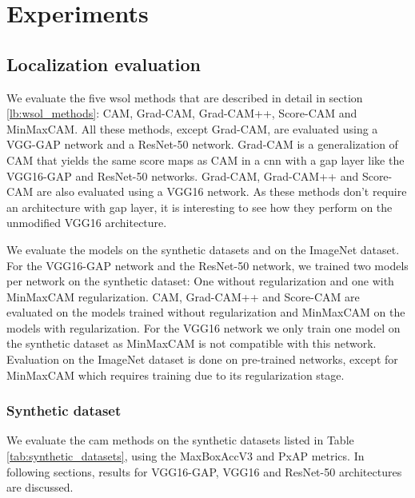 \chapter{Experiments}



\section{Localization evaluation}
We evaluate the five \acrshort{wsol} methods that are described in detail in section \ref{lb:wsol_methods}: CAM, Grad-CAM, Grad-CAM++, Score-CAM and MinMaxCAM. All these methods, except Grad-CAM, are evaluated using a VGG-GAP network and a ResNet-50 network. Grad-CAM is a generalization of CAM that yields the same score maps as CAM in a \acrshort{cnn} with a \acrshort{gap} layer like the VGG16-GAP and ResNet-50 networks. Grad-CAM, Grad-CAM++ and Score-CAM are also evaluated using a VGG16 network. As these methods don't require an architecture with \acrshort{gap} layer, it is interesting to see how they perform on the unmodified VGG16 architecture.

We evaluate the models on the synthetic datasets and on the ImageNet dataset. For the VGG16-GAP network and the ResNet-50 network, we trained two models per network on the synthetic dataset: One without regularization and one with MinMaxCAM regularization. CAM, Grad-CAM++ and Score-CAM are evaluated on the models trained without regularization and MinMaxCAM on the models with regularization. For the VGG16 network we only train one model on the synthetic dataset as MinMaxCAM is not compatible with this network. Evaluation on the ImageNet dataset is done on pre-trained networks, except for MinMaxCAM which requires training due to its regularization stage.

\subsection{Synthetic dataset}
We evaluate the \acrshort{cam} methods on the synthetic datasets listed in Table \ref{tab:synthetic_datasets}, using the MaxBoxAccV3 and PxAP metrics. In following sections, results for VGG16-GAP, VGG16 and ResNet-50 architectures are discussed.

